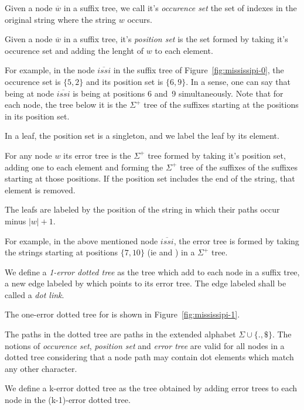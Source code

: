 \begin{definition}
Given a node $\overline{w}$ in a suffix tree, we call it's \emph{occurence set} the set of indexes in the original string where the string $w$ occurs.
\end{definition}

\begin{definition}
Given a node $\overline{w}$ in a suffix tree, it's \emph{position set} is the set formed by taking it's occurence set and adding the lenght of $w$ to each element.
\end{definition}

For example, in the node $\overline{issi}$ in the suffix tree of Figure~\ref{fig:mississipi-0}, the occurence set is $\{5, 2\}$ and its position set is $\{6, 9\}$. In a sense, one can say that being at node $\overline{issi}$ is being at positions 6 and~9 simultaneously. Note that for each node, the tree below it is the $\Sigma^+$ tree of the suffixes starting at the positions in its position set.

In a leaf, the position set is a singleton, and we label the leaf by its element.

\begin{definition}
For any node $w$ its error tree is the $\Sigma^+$ tree formed by taking it's position set, adding one to each element and forming the $\Sigma^+$ tree of the suffixes of the suffixes starting at those positions. If the position set includes the end of the string, that element is removed.

The leafs are labeled by the position of the string in which their paths occur minus $|w| + 1$.
\end{definition}

For example, in the above mentioned node $\overline{issi}$, the error tree is formed by taking the strings starting at positions $\{7, 10\}$ (ie  and ) in a $\Sigma^+$ tree.

\begin{definition}
We define a \emph{1-error dotted tree} as the tree which add to each node in a suffix tree, a new edge labeled by  which points to its error tree. The edge labeled  shall be called a \emph{dot link}.
\end{definition}

The one-error dotted tree for  is shown in Figure~\ref{fig:mississipi-1}.

The paths in the dotted tree are paths in the extended alphabet $\Sigma\cup\{.,\$\}$. The notions of \emph{occurence set}, \emph{position set} and \emph{error tree} are valid for all nodes in a dotted tree considering that a node path may contain dot elements which match any other character.

\begin{definition}
We define a k-error dotted tree as the tree obtained by adding error trees to each node in the (k-1)-error dotted tree.
\end{definition}

